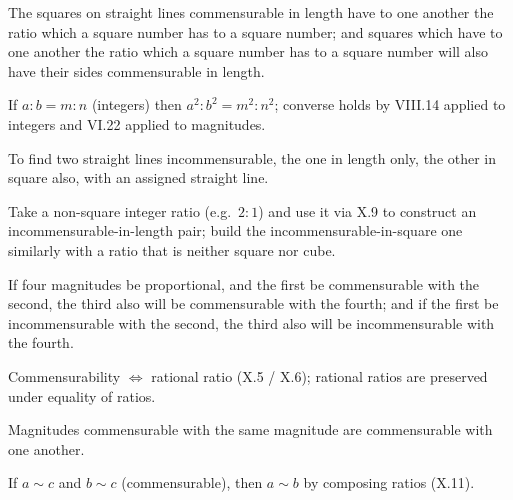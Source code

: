 \begin{claim}
\label{prop:X.9}
The squares on straight lines commensurable in length have to one
another the ratio which a square number has to a square number; and
squares which have to one another the ratio which a square number
has to a square number will also have their sides commensurable in
length.
\end{claim}
\begin{evidence}[Proof of X.9]
\label{ev:X.9}
If $a : b = m : n$ (integers) then $a^2 : b^2 = m^2 : n^2$; converse
holds by VIII.14 applied to integers and VI.22 applied to magnitudes.
\end{evidence}

\begin{claim}
\label{prop:X.10}
To find two straight lines incommensurable, the one in length only,
the other in square also, with an assigned straight line.
\end{claim}
\begin{evidence}[Proof of X.10]
\label{ev:X.10}
Take a non-square integer ratio (e.g.\ $2 : 1$) and use it via X.9 to
construct an incommensurable-in-length pair; build the
incommensurable-in-square one similarly with a ratio that is neither
square nor cube.
\end{evidence}

\begin{claim}
\label{prop:X.11}
If four magnitudes be proportional, and the first be commensurable
with the second, the third also will be commensurable with the
fourth; and if the first be incommensurable with the second, the
third also will be incommensurable with the fourth.
\end{claim}
\begin{evidence}[Proof of X.11]
\label{ev:X.11}
Commensurability $\iff$ rational ratio (X.5 / X.6); rational ratios
are preserved under equality of ratios.
\end{evidence}

\begin{claim}
\label{prop:X.12}
Magnitudes commensurable with the same magnitude are commensurable
with one another.
\end{claim}
\begin{evidence}[Proof of X.12]
\label{ev:X.12}
If $a \sim c$ and $b \sim c$ (commensurable), then $a \sim b$ by
composing ratios (X.11).
\end{evidence}

